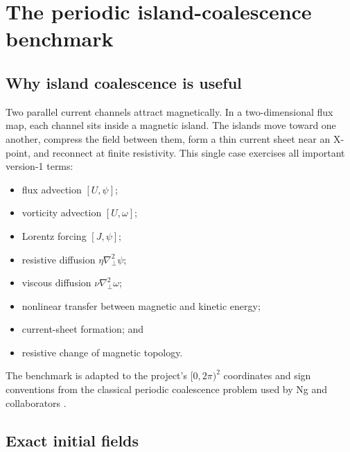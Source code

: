 \documentclass[11pt]{article}
\newcommand{\bracket}[2]{\left[#1,#2\right]}
\newcommand{\Lap}{\nabla_{\!\perp}^{2}}
\begin{document}
\section{The periodic island-coalescence benchmark}
\label{sec:initial}

\subsection{Why island coalescence is useful}

Two parallel current channels attract magnetically. In a two-dimensional flux map, each channel sits inside a magnetic island. The islands move toward one another, compress the field between them, form a thin current sheet near an X-point, and reconnect at finite resistivity. This single case exercises all important version-1 terms:
\begin{itemize}
  \item flux advection $\bracket{U}{\psi}$;
  \item vorticity advection $\bracket{U}{\omega}$;
  \item Lorentz forcing $\bracket{J}{\psi}$;
  \item resistive diffusion $\eta\Lap\psi$;
  \item viscous diffusion $\nu\Lap\omega$;
  \item nonlinear transfer between magnetic and kinetic energy;
  \item current-sheet formation; and
  \item resistive change of magnetic topology.
\end{itemize}

The benchmark is adapted to the project's $[0,2\pi)^2$ coordinates and sign conventions from the classical periodic coalescence problem used by Ng and collaborators \cite{Ng2008,Ng2011}.

\subsection{Exact initial fields}
\end{document}
